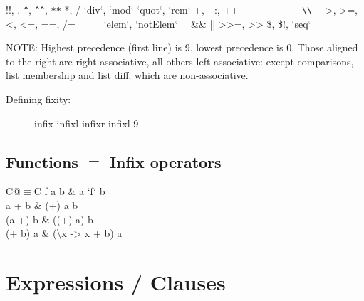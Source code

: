 \documentclass{refcard}
\newcommand{\la}{\textbackslash}
\begin{document}
\begin{Ldesc}
	 !!, \hfill .
	 \hfill \verb+^+, \verb+^^+, \verb+**+
	 *, /
	 `div`, `mod`
	 `quot`, `rem`
	 +, -
	 \hfill :, ++
	                 ~~~~~~~~~~~~\verb+\\+
	\Li[comparisons:]     ~~>, >=, <, <=, ==, /=~~
	  ~~~`elem`, `notElem`~~
	 \hfill \&\&
	\Li[boolean or] \hfill ||
	 >>=, >>
	 \$, \$!, `seq`
\end{Ldesc}

\noindent
NOTE: Highest precedence (first line) is 9, lowest precedence is 0.  Those
aligned to the right are right associative, all others left associative: except
comparisons, list membership and list diff. which are non-associative.

\begin{description}
\item [Defining fixity:]
\begin{ldesc}
	 infix  
	 infixl  \I{+--+}
	 infixr  \I{-!-}
	 infixl 9
\end{ldesc}
\end{description}

\subsection{Functions $\equiv$ Infix operators}

\begin{tabular}{C@{\s$\equiv$\s}C}
	f a b & a `f` b \\
	a + b & (+) a b \\
	(a +) b & ((+) a) b \\
	(+ b) a & (\la{}x -> x + b) a \\
\end{tabular}


\section{Expressions / Clauses}
\end{document}
